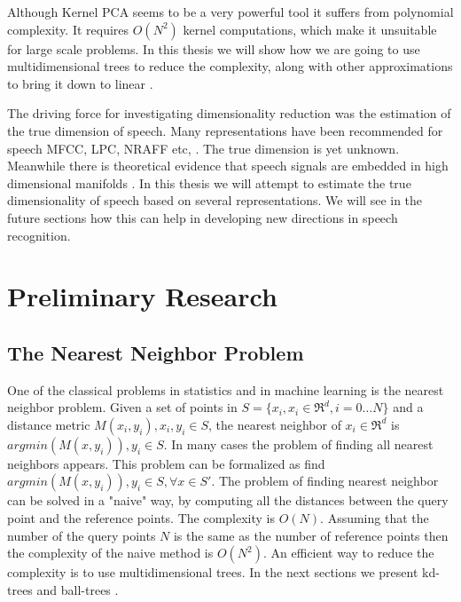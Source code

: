 \documentclass[12pt,letterpaper,doublespaced,ETD,dvips,proposal]{gtthesis}
\begin{document}
\begin{Body}
Although Kernel PCA  seems to be a very powerful tool it suffers from
polynomial complexity. It requires $O(N^2)$ kernel computations,
which make it unsuitable for large scale problems. In this thesis we
will show how we are going to use multidimensional trees to reduce
the complexity, along with other approximations to bring it down to
linear \cite{gray2000nbp}.

The driving force for investigating dimensionality reduction was the
estimation of the true dimension of speech. Many representations
have been recommended for speech MFCC, LPC, NRAFF etc, \cite{quatieri2002dts,rabiner1978dps, ravindran:inr}. The true
dimension is yet unknown. Meanwhile there is theoretical evidence
that speech signals are embedded in high dimensional manifolds 
\cite{alder1991dss, sciamarella1999tsc, kumar1990ade, tishby1990dsa, jansen2006ifa}. In
this thesis we will attempt to estimate the true dimensionality of
speech based on several representations. We will see in the future
sections how this can help in developing new directions in speech
recognition.

\section{Preliminary Research}
\label{prelim}
\subsection{The Nearest Neighbor Problem}
\label{The_Nearest_Neighbor_Problem}

One of the classical problems in statistics and in machine learning 
is the nearest neighbor problem. Given a set of points in $S =
\{x_i, x_i\in\Re^d, i=0\dots N\}$ and a distance metric $M(x_i, y_i),
x_i, y_i \in S$,  the nearest neighbor of $x_i \in \Re^d$ is
$argmin(M(x, y_i)), y_i \in S$. In many cases the problem of finding
all nearest neighbors appears. This problem can be formalized as
find $argmin(M(x, y_i)), y_i \in S, \forall x \in S'$. The problem
of finding nearest neighbor can be solved in a "naive" way, by
computing all the distances between the query point and the
reference points. The complexity is $O(N)$. Assuming that the number
of the query points $N$ is the same as the number of reference
points then the complexity of the naive method is $O(N^2)$. An
efficient way to reduce the complexity is to use multidimensional
trees. In the next sections we present kd-trees \cite{moore-tutorial} 
and ball-trees \cite{moore2000ahu}.


\end{Body}
\end{document}
